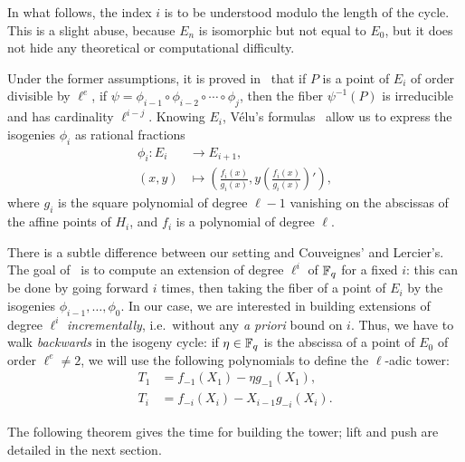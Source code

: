 \documentclass{sig-alternate}
\begin{document}
In what follows, the index $i$ is to be understood modulo the length of
the cycle. This is a slight abuse, because $E_n$ is isomorphic but not
equal to $E_0$, but it does not hide any theoretical or computational
difficulty.

Under the former assumptions, it is proved
in~\cite[\S~4]{couveignes+lercier11} that if $P$ is a point of
$E_i$ of order divisible by $\ell^e$, if
$\psi=\phi_{i-1}\circ\phi_{i-2}\circ\cdots\circ\phi_{j}$, then the
fiber $\psi^{-1}(P)$ is irreducible and has cardinality $\ell^{i-j}$.
Knowing $E_i$, Vélu's formulas~\cite{velu71} allow us to express the
isogenies $\phi_i$ as rational fractions
\begin{equation}
  \begin{aligned}
    \phi_i: E_i &\to E_{i+1},\\
    (x,y) &\mapsto \left(\frac{f_i(x)}{g_i(x)}, y\left(\frac{f_i(x)}{g_i(x)}\right)'\right),
  \end{aligned}
\end{equation}
where $g_i$ is the square polynomial of degree $\ell-1$ vanishing on
the abscissas of the affine points of $H_i$, and $f_i$ is a polynomial
of degree $\ell$. 

There is a subtle difference between our setting and Couveignes' and
Lercier's. The goal of~\cite{couveignes+lercier11} is to compute an
extension of degree $\ell^i$ of $\mathbb{F}_q$ for a fixed $i$: this can be
done by going forward $i$ times, then taking the fiber of a point of $E_i$ by
the isogenies $\phi_{i-1}, \ldots, \phi_0$. In our case, we are
interested in building extensions of degree $\ell^i$
\emph{incrementally}, i.e.\ without any \emph{a priori} bound on
$i$. Thus, we have to walk \emph{backwards} in the isogeny cycle: if
$\eta\in\mathbb{F}_q$ is the abscissa of a point of $E_0$ of order $\ell^e\ne
2$, we will use the following polynomials to define the $\ell$-adic
tower:
\begin{align*}
  T_1 &= f_{-1}(X_1) - \eta g_{-1}(X_1),\\ 
  T_i &= f_{-i}(X_i) - X_{i-1} g_{-i}(X_i).
\end{align*}

The following theorem gives the time for building the tower; lift and
push are detailed in the next section. 
\end{document}
